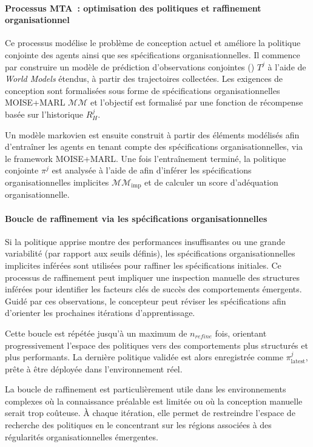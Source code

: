 


\paragraph{Processus MTA~: optimisation des politiques et raffinement organisationnel}

Ce processus modélise le problème de conception actuel et améliore la politique conjointe des agents ainsi que ses spécifications organisationnelles. Il commence par construire un modèle de prédiction d'observations conjointes () $T^j$ à l'aide de \textit{World Models} étendus, à partir des trajectoires collectées. Les exigences de conception sont formalisées sous forme de spécifications organisationnelles MOISE+MARL $\mathcal{MM}$ et l'objectif est formalisé par une fonction de récompense basée sur l'historique $R^j_H$.

Un modèle markovien est ensuite construit à partir des éléments modélisés afin d'entraîner les agents en tenant compte des spécifications organisationnelles, via le framework MOISE+MARL. Une fois l'entraînement terminé, la politique conjointe $\pi^j$ est analysée à l'aide de  afin d'inférer les spécifications organisationnelles implicites $\mathcal{MM}_{\text{imp}}$ et de calculer un score d'adéquation organisationnelle.

\paragraph{Boucle de raffinement via les spécifications organisationnelles}

Si la politique apprise montre des performances insuffisantes ou une grande variabilité (par rapport aux seuils définis), les spécifications organisationnelles implicites inférées sont utilisées pour raffiner les spécifications initiales. Ce processus de raffinement peut impliquer une inspection manuelle des structures inférées pour identifier les facteurs clés de succès des comportements émergents. Guidé par ces observations, le concepteur peut réviser les spécifications afin d'orienter les prochaines itérations d'apprentissage.

Cette boucle est répétée jusqu'à un maximum de $n_{refine}$ fois, orientant progressivement l'espace des politiques vers des comportements plus structurés et plus performants. La dernière politique validée est alors enregistrée comme $\pi^j_{\text{latest}}$, prête à être déployée dans l'environnement réel.

La boucle de raffinement est particulièrement utile dans les environnements complexes où la connaissance préalable est limitée ou où la conception manuelle serait trop coûteuse. À chaque itération, elle permet de restreindre l'espace de recherche des politiques en le concentrant sur les régions associées à des régularités organisationnelles émergentes.


